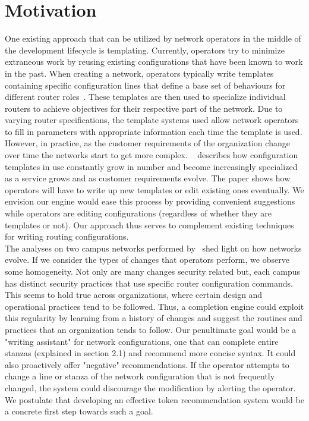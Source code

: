 \section{Motivation}
One existing approach that can be utilized by network operators in the middle of the development lifecycle is templating. Currently, operators try to minimize extraneous work by reusing existing configurations that have been known to work in the past. When creating a network, operators typically write templates containing specific configuration lines that define a base set of behaviours for different router roles~\cite{complexity}. These templates are then used to specialize individual routers to achieve objectives for their respective part of the network. Due to varying router specifications, the template systems used allow network operators to fill in parameters with appropriate information each time the template is used. However, in practice, as the customer requirements of the organization change over time the networks start to get more complex. ~\cite{Benson} describes how configuration templates in use constantly grow in number and become increasingly specialized as a service grows and as customer requirements evolve. The paper shows how operators will have to write up new templates or edit existing ones eventually. We envision our engine would ease this process by providing convenient suggestions while operators are editing configurations (regardless of whether they are templates or not).
Our approach thus serves to complement existing techniques for writing routing configurations.\\ 

The analyses on two campus networks performed by~\cite{Kim} shed light on how networks evolve. If we consider the types of changes that operators perform, we observe some homogeneity. Not only are many changes security related but, each campus has distinct security practices that use specific router configuration commands. This seems to hold true across organizations, where certain design and operational practices tend to be followed. Thus, a completion engine could exploit this regularity by learning from a history of changes and suggest the routines and practices that an organization tends to follow. Our penultimate goal would be a "writing assistant" for network configurations, one that can complete entire stanzas (explained in section 2.1) and recommend more concise syntax. It could also proactively offer "negative" recommendations. If the operator attempts to change a line or stanza of the network configuration that is not frequently changed, the system could discourage the modification by alerting the operator. We postulate that developing an effective token recommendation system would be a concrete first step towards such a goal.\\

